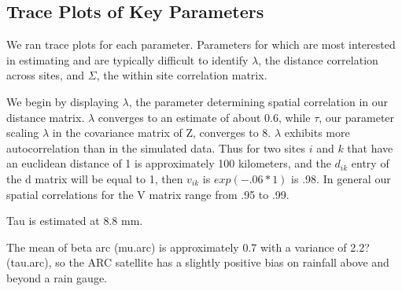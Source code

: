 \documentclass[11pt]{article}
\begin{document}
\subsection{Trace Plots of Key Parameters}

We ran trace plots for each parameter. Parameters for which are most interested in estimating and are typically difficult to identify $\lambda$, the distance correlation across sites, and $\Sigma$, the within site correlation matrix. 






We begin by displaying $\lambda$, the parameter determining spatial correlation in our distance matrix. $\lambda$ converges to an estimate of about 0.6, while $\tau$, our parameter scaling $\lambda$ in the covariance matrix of Z, converges to 8. $\lambda$ exhibits more autocorrelation than in the simulated data. Thus for two sites $i$ and $k$ that have an euclidean distance of 1 is approximately 100 kilometers, and the $d_{ik}$ entry of the d matrix will be equal to 1, then $v_{ik}$ is $exp(-.06*1)$ is .98. In general our spatial correlations for the V matrix range from .95 to .99. 

Tau is estimated at 8.8 mm.

The mean of beta arc (mu.arc) is approximately 0.7 with a  variance of 2.2? (tau.arc), so the ARC satellite has a slightly positive bias on rainfall above and beyond a rain gauge. 





\end{document}
